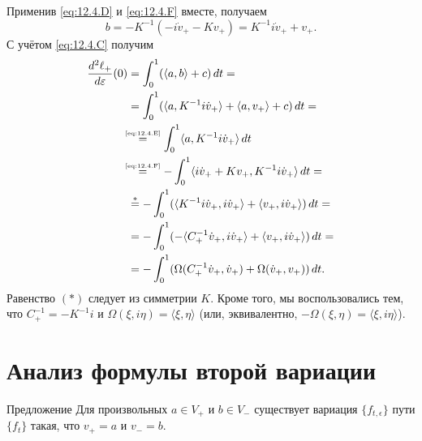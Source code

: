 Применив \ref{eq:12.4.D} и \ref{eq:12.4.F} вместе, получаем
\[b=-K^{-1}(-i\dot v_+ - K v_+) = K^{-1}i\dot v_+ + v_+.\]
С учётом \ref{eq:12.4.C} получим
\begin{align*}
\frac{d^2\ell_+}{d\varepsilon}(0)
&=
\int_0^1(\langle a, b\rangle+c)\,d t=
\\
&=\int_0^1(\langle a, K^{-1}i\dot v_+\rangle+\langle a, v_+\rangle+c)\,d t=
\\
&\!\!\!\stackrel{\text{\tiny \ref{eq:12.4.E}}}{=}
\int_0^1 \langle a,
K^{-1}i\dot v_+\rangle\,d t 
\\
&\!\!\!\stackrel{\text{\tiny \ref{eq:12.4.F}}}{=}
-\int_0^1\langle i\dot
v_++Kv_+, K^{-1}i\dot v_+\rangle\,d t= 
\\
&\stackrel{{*}}{=}
-\int_0^1
(\langle K^{-1}i\dot v_+, i\dot v_+\rangle +\langle v_+,
i\dot v_+\rangle)\,d t= 
\\
&=
-\int_0^1
(-\langle C_+^{-1}\dot v_+, i\dot v_+\rangle
+\langle v_+, i\dot v_+\rangle)\,d t=
\\
&=
-\int_0^1
(\Omega(C_+^{-1}\dot v_+,\dot v_+)+\Omega(\dot v_+,v_+))\,d t.
\end{align*}
Равенство $({*})$ следует из симметрии $K$.
Кроме того, мы воспользовались тем, что $C_+^{-1} = -K^{-1} i$ и
$\Omega(\xi, i\eta) = \langle \xi, \eta\rangle$ 
(или, эквивалентно, $-\Omega(\xi, \eta) = \langle \xi, i\eta\rangle$).
\qeds

\section{Анализ формулы второй вариации}\label{sec:12.5}

\begin{thm}{Предложение}\label{12.5.A}
Для произвольных $a \in V_+$ и $b \in V_-$ существует вариация
$\{f_{t,\epsilon}\}$ пути $\{f_t\}$ такая, что $v_+ = a$ и $v_- = b$. 
\end{thm}

